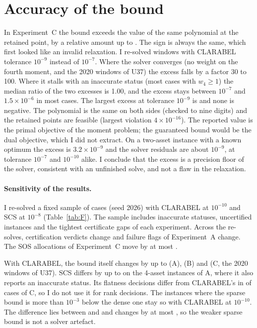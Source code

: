 \documentclass[11pt,a4paper]{article}
\begin{document}
\section{Accuracy of the bound}\label{app:acc}
In Experiment~C the bound exceeds the value of the same polynomial at the retained point, by a relative amount up to \xDefMaxU{}.
The sign is always the same, which first looked like an invalid relaxation.
I re-solved \xN{} windows with CLARABEL tolerance $10^{-9}$ instead of $10^{-7}$.
Where the solver converges (no weight on the fourth moment, and the 2020 windows of U37) the excess falls by a factor 30 to 100.
Where it stalls with an inaccurate status (most cases with $w_4\ge1$) the median ratio of the two excesses is 1.00, and the excess stays between $10^{-7}$ and $1.5\times10^{-6}$ in most cases.
The largest excess at tolerance $10^{-9}$ is \xTightMax{} and none is negative.
The polynomial is the same on both sides (checked to nine digits) and the retained points are feasible (largest violation $4\times10^{-16}$).
The reported value is the primal objective of the moment problem; the guaranteed bound would be the dual objective, which I did not extract.
On a two-asset instance with a known optimum the excess is $3.2\times10^{-9}$ and the solver residuals are about $10^{-9}$, at tolerance $10^{-7}$ and $10^{-10}$ alike.
I conclude that the excess is a precision floor of the solver, consistent with an unfinished solve, and not a flaw in the relaxation.

\paragraph{Sensitivity of the results.}
I re-solved a fixed sample of \spCases{} cases (seed 2026) with CLARABEL at $10^{-10}$ and SCS at $10^{-8}$ (Table~\ref{tab:F}).
The sample includes inaccurate statuses, uncertified instances and the tightest certificate gaps of each experiment.
Across the \spRuns{} re-solves, \spFlips{} certification verdicts change and \spFlagCh{} failure flags of Experiment~A change.
The SOS allocations of Experiment~C move by at most \spMaxW{}.


With CLARABEL, the bound itself changes by up to \spACl{} (A), \spBCl{} (B) and \spCCl{} (C, the 2020 windows of U37).
SCS differs by up to \spAScs{} on the 4-asset instances of A, where it also reports an inaccurate status.
Its flatness decisions differ from CLARABEL's in \spFlatFlips{} of \spFlatN{} cases of C, so I do not use it for rank decisions.
The \spDdN{} instances where the sparse bound is more than $10^{-3}$ below the dense one stay so with CLARABEL at $10^{-10}$.
The difference lies between \spDdMin{} and \spDdMax{} and changes by at most \spDdChange{}, so the weaker sparse bound is not a solver artefact.
\end{document}

